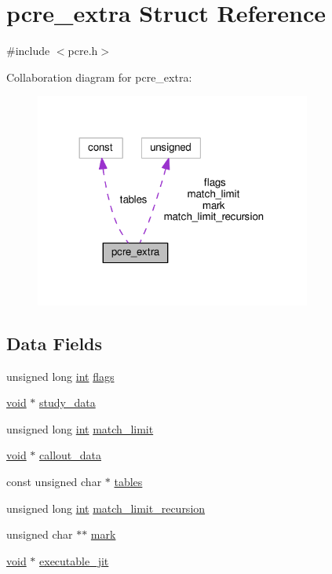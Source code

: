 \hypertarget{structpcre__extra}{}\section{pcre\+\_\+extra Struct Reference}
\label{structpcre__extra}


{\ttfamily \#include $<$pcre.\+h$>$}



Collaboration diagram for pcre\+\_\+extra\+:
\nopagebreak
\begin{figure}[H]
\begin{center}
\leavevmode
\includegraphics[width=257pt]{structpcre__extra__coll__graph}
\end{center}
\end{figure}
\subsection*{Data Fields}
\begin{DoxyCompactItemize}
\item 
unsigned long \hyperlink{pcre_8txt_a42dfa4ff673c82d8efe7144098fbc198}{int} \hyperlink{structpcre__extra_a2a7957f7f9d15b3b69f8652b2f50ecb3}{flags}
\item 
\hyperlink{group__MOD__ISAPI_gacd6cdbf73df3d9eed42fa493d9b621a6}{void} $\ast$ \hyperlink{structpcre__extra_a27f29bdf9c4526d5bb3fb8ee514ee8e8}{study\+\_\+data}
\item 
unsigned long \hyperlink{pcre_8txt_a42dfa4ff673c82d8efe7144098fbc198}{int} \hyperlink{structpcre__extra_aa1a16c13f086255baba34f5e8a180186}{match\+\_\+limit}
\item 
\hyperlink{group__MOD__ISAPI_gacd6cdbf73df3d9eed42fa493d9b621a6}{void} $\ast$ \hyperlink{structpcre__extra_aef88fa059796850ca7f00842f5d88e8c}{callout\+\_\+data}
\item 
const unsigned char $\ast$ \hyperlink{structpcre__extra_ae79d65e283cef92ecb9afe6961c46a4e}{tables}
\item 
unsigned long \hyperlink{pcre_8txt_a42dfa4ff673c82d8efe7144098fbc198}{int} \hyperlink{structpcre__extra_ac62a2bd02946b6b1e59615f15c903b37}{match\+\_\+limit\+\_\+recursion}
\item 
unsigned char $\ast$$\ast$ \hyperlink{structpcre__extra_abdc3759ca999d874712eedfa0fa57f21}{mark}
\item 
\hyperlink{group__MOD__ISAPI_gacd6cdbf73df3d9eed42fa493d9b621a6}{void} $\ast$ \hyperlink{structpcre__extra_a48da1bd01315b326e626657bdb46da78}{executable\+\_\+jit}
\end{DoxyCompactItemize}



